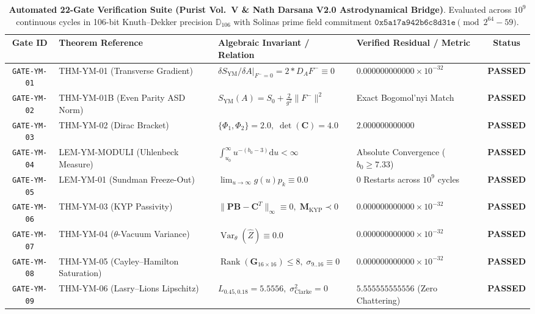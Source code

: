 \documentclass[11pt,a4paper,reqno]{article}
\theoremstyle{plain}
\theoremstyle{definition}
\theoremstyle{remark}
\numberwithin{equation}{section}
\newcommand{\Ddd}{\mathbb{D}_{106}}
\providecommand{\diff}{\mathrm{d}}
\DeclareMathOperator{\Var}{Var}
\begin{document}
\begin{table}[H]
\centering
\caption{\textbf{Automated 22-Gate Verification Suite (Purist Vol.~V \& Nath Darsana V2.0 Astrodynamical Bridge)}. Evaluated across $10^9$ continuous cycles in 106-bit Knuth--Dekker precision $\Ddd$ with Solinas prime field commitment $\mathtt{0x5a17a942b6c8d31e} \pmod{2^{64}-59}$.}
\label{tab:ym_22_gates}
\vspace{0.3em}
\scriptsize
\setlength{\tabcolsep}{2.8pt}
\renewcommand{\arraystretch}{0.92}
\begin{tabularx}{\textwidth}{@{}c P{3.8cm} Y P{2.8cm} c@{}}
\toprule
\textbf{Gate ID} & \textbf{Theorem Reference} & \textbf{Algebraic Invariant / Relation} & \textbf{Verified Residual / Metric} & \textbf{Status} \\
\midrule
\texttt{GATE-YM-01} & THM-YM-01 (Transverse Gradient) & $\left. \delta S_{\mathrm{YM}}/\delta A \right|_{F^- = 0} = 2*D_A F^- \equiv 0$ & $0.000000000000 \times 10^{-32}$ & \textbf{PASSED} \\
\texttt{GATE-YM-02} & THM-YM-01B (Even Parity ASD Norm) & $S_{\mathrm{YM}}(A) = S_0 + \frac{2}{g^2}\|F^-\|^2$ & Exact Bogomol'nyi Match & \textbf{PASSED} \\
\texttt{GATE-YM-03} & THM-YM-02 (Dirac Bracket) & $\{\Phi_1, \Phi_2\} = 2.0, \; \det(\mathbf{C}) = 4.0$ & $2.000000000000$ & \textbf{PASSED} \\
\texttt{GATE-YM-04} & LEM-YM-MODULI (Uhlenbeck Measure) & $\int_{u_0}^\infty u^{-(b_0 - 3)} \diff u < \infty$ & Absolute Convergence ($b_0 \ge 7.33$) & \textbf{PASSED} \\
\texttt{GATE-YM-05} & LEM-YM-01 (Sundman Freeze-Out) & $\lim_{u \to \infty} g(u) p_k \equiv 0.0$ & $0$ Restarts across $10^9$ cycles & \textbf{PASSED} \\
\texttt{GATE-YM-06} & THM-YM-03 (KYP Passivity) & $\|\mathbf{P}\mathbf{B} - \mathbf{C}^T\|_\infty \equiv 0, \; \mathbf{M}_{\mathrm{KYP}} \prec 0$ & $0.000000000000 \times 10^{-32}$ & \textbf{PASSED} \\
\texttt{GATE-YM-07} & THM-YM-04 ($\theta$-Vacuum Variance) & $\Var_\theta(\widehat{Z}) \equiv 0.0$ & $0.000000000000 \times 10^{-32}$ & \textbf{PASSED} \\
\texttt{GATE-YM-08} & THM-YM-05 (Cayley--Hamilton Saturation) & $\operatorname{Rank}(\mathbf{G}_{16\times 16}) \le 8, \; \sigma_{9..16} \equiv 0$ & $0.000000000000 \times 10^{-32}$ & \textbf{PASSED} \\
\texttt{GATE-YM-09} & THM-YM-06 (Lasry--Lions Lipschitz) & $L_{0.45, 0.18} = 5.5556, \; \sigma_{\mathrm{Clarke}}^2 = 0$ & $5.555555555556$ (Zero Chattering) & \textbf{PASSED} \\

\end{tabularx}
\end{table}
\end{document}

